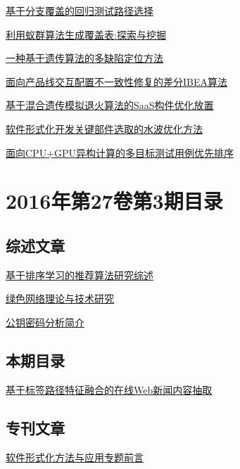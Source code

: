 \documentclass[a4paper]{article}
\begin{document}
\href{http://www.jos.org.cn/ch/reader/download_pdf.aspx?file_no=4975&year_id=2016&quarter_id=4&falg=1}{基于分支覆盖的回归测试路径选择}

\href{http://www.jos.org.cn/ch/reader/download_pdf.aspx?file_no=4974&year_id=2016&quarter_id=4&falg=1}{利用蚁群算法生成覆盖表:探索与挖掘}

\href{http://www.jos.org.cn/ch/reader/download_pdf.aspx?file_no=4970&year_id=2016&quarter_id=4&falg=1}{一种基于遗传算法的多缺陷定位方法}

\href{http://www.jos.org.cn/ch/reader/download_pdf.aspx?file_no=4969&year_id=2016&quarter_id=4&falg=1}{面向产品线交互配置不一致性修复的差分IBEA算法}

\href{http://www.jos.org.cn/ch/reader/download_pdf.aspx?file_no=4965&year_id=2016&quarter_id=4&falg=1}{基于混合遗传模拟退火算法的SaaS构件优化放置}

\href{http://www.jos.org.cn/ch/reader/download_pdf.aspx?file_no=4964&year_id=2016&quarter_id=4&falg=1}{软件形式化开发关键部件选取的水波优化方法}

\href{http://www.jos.org.cn/ch/reader/download_pdf.aspx?file_no=4968&year_id=2016&quarter_id=4&falg=1}{面向CPU+GPU异构计算的多目标测试用例优先排序}


\section{\textbf{2016年第27卷第3期目录}}
\subsection{综述文章}
\href{http://www.jos.org.cn/ch/reader/download_pdf.aspx?file_no=4948&year_id=2016&quarter_id=3&falg=1}{基于排序学习的推荐算法研究综述}

\href{http://www.jos.org.cn/ch/reader/download_pdf.aspx?file_no=4947&year_id=2016&quarter_id=3&falg=1}{绿色网络理论与技术研究}

\href{http://www.jos.org.cn/ch/reader/download_pdf.aspx?file_no=4922&year_id=2016&quarter_id=3&falg=1}{公钥密码分析简介}

\subsection{本期目录}
\href{http://www.jos.org.cn/ch/reader/download_pdf.aspx?file_no=4868&year_id=2016&quarter_id=3&falg=1}{基于标签路径特征融合的在线Web新闻内容抽取}

\subsection{专刊文章}
\href{http://www.jos.org.cn/ch/reader/download_pdf.aspx?file_no=4990&year_id=2016&quarter_id=3&falg=1}{软件形式化方法与应用专题前言}
\end{document}
